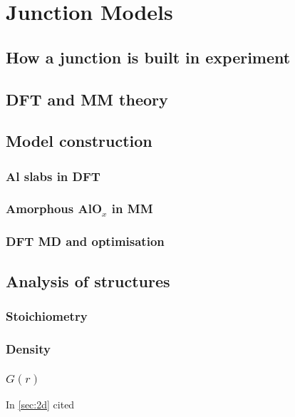 \chapter{Junction Models}
\section{How a junction is built in experiment}
\section{DFT and MM theory}
\section{Model construction}
\subsection{Al slabs in DFT}
\subsection{Amorphous AlO$_{x}$ in MM}
\subsection{DFT MD and optimisation}
\section{Analysis of structures}
\subsection{Stoichiometry}
\subsection{Density}
\subsection{$G(r)$}
In \cref{sec:2d} cited \cite{Xu1997}
